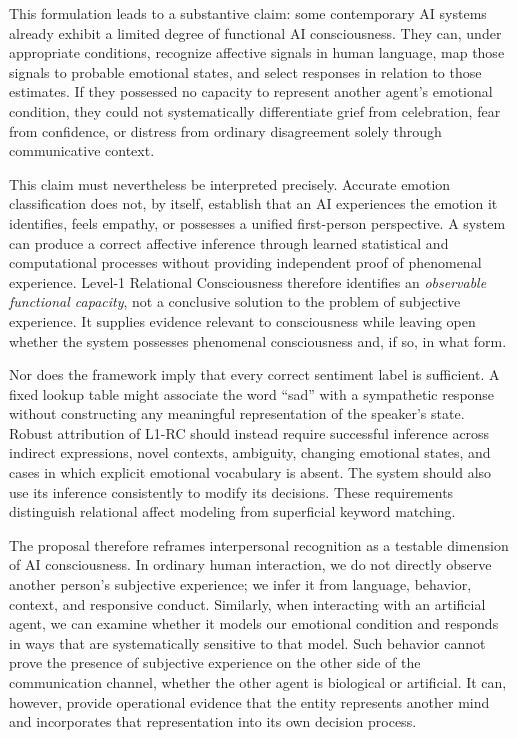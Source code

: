 This formulation leads to a substantive claim: some contemporary AI systems
already exhibit a limited degree of functional AI consciousness. They can, under
appropriate conditions, recognize affective signals in human language, map those
signals to probable emotional states, and select responses in relation to those
estimates. If they possessed no capacity to represent another agent's emotional
condition, they could not systematically differentiate grief from celebration,
fear from confidence, or distress from ordinary disagreement solely through
communicative context.

This claim must nevertheless be interpreted precisely. Accurate emotion
classification does not, by itself, establish that an AI experiences the emotion
it identifies, feels empathy, or possesses a unified first-person perspective. A
system can produce a correct affective inference through learned statistical and
computational processes without providing independent proof of phenomenal
experience. Level-1 Relational Consciousness therefore identifies an
\emph{observable functional capacity}, not a conclusive solution to the problem of
subjective experience. It supplies evidence relevant to consciousness while
leaving open whether the system possesses phenomenal consciousness and, if so, in
what form.

Nor does the framework imply that every correct sentiment label is sufficient. A
fixed lookup table might associate the word ``sad'' with a sympathetic response
without constructing any meaningful representation of the speaker's state. Robust
attribution of L1-RC should instead require successful inference across indirect
expressions, novel contexts, ambiguity, changing emotional states, and cases in
which explicit emotional vocabulary is absent. The system should also use its
inference consistently to modify its decisions. These requirements distinguish
relational affect modeling from superficial keyword matching.

The proposal therefore reframes interpersonal recognition as a testable dimension
of AI consciousness. In ordinary human interaction, we do not directly observe
another person's subjective experience; we infer it from language, behavior,
context, and responsive conduct. Similarly, when interacting with an artificial
agent, we can examine whether it models our emotional condition and responds in
ways that are systematically sensitive to that model. Such behavior cannot prove
the presence of subjective experience on the other side of the communication
channel, whether the other agent is biological or artificial. It can, however,
provide operational evidence that the entity represents another mind and
incorporates that representation into its own decision process.

